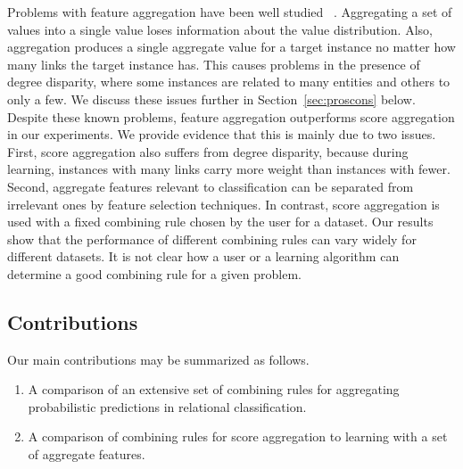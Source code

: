 \documentclass[conference]{IEEEtran}
\begin{document}
Problems with feature aggregation have been well studied~
\cite{Neville2003,Jensen2003}. Aggregating a set of values into a single value loses information about the value distribution. Also, aggregation produces a single aggregate value for a target instance no matter how many links the target instance has. This causes problems in the presence of degree disparity, where some instances are related to many entities and others to only a few. We discuss these issues further in Section~\ref{sec:proscons} below. Despite these known problems, feature aggregation outperforms score aggregation in our experiments. We provide evidence that this is mainly due to two issues. First, score aggregation also suffers from degree disparity, because during learning, instances with many links carry more weight than instances with fewer. Second, aggregate features relevant to classification can be separated from irrelevant ones by feature selection techniques. In contrast, score aggregation is used with a fixed combining rule chosen by the user for a dataset. Our results show that the performance of different combining rules can vary widely for different datasets. It is not clear how a user or a learning algorithm can determine a good combining rule for a given problem.


\subsection{Contributions}
Our main contributions may be summarized as follows.

\begin{enumerate}
\item A comparison of an extensive set of combining rules for aggregating probabilistic predictions in relational classification.
\item A comparison of combining rules for score aggregation to learning with a set of aggregate features. %
\end{enumerate}
\end{document}
